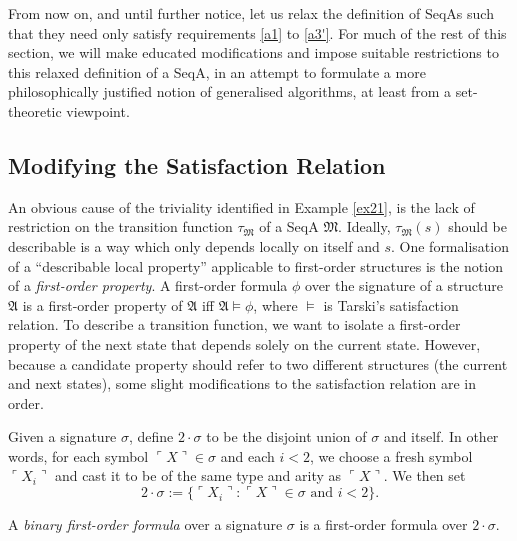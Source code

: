 \documentclass[12pt]{article}
\numberwithin{equation}{section}
\begin{document}
From now on, and until further notice, let us relax the definition of SeqAs such that they need only satisfy requirements \ref{a1} to \ref{a3'}. For much of the rest of this section, we will make educated modifications and impose suitable restrictions to this relaxed definition of a SeqA, in an attempt to formulate a more philosophically justified notion of generalised algorithms, at least from a set-theoretic viewpoint.

\subsection{Modifying the Satisfaction Relation}

An obvious cause of the triviality identified in Example \ref{ex21}, is the lack of restriction on the transition function $\tau_{\mathfrak{M}}$ of a SeqA $\mathfrak{M}$. Ideally, $\tau_{\mathfrak{M}}(s)$ should be describable is a way which only depends locally on itself and $s$. One formalisation of a ``describable local property'' applicable to first-order structures is the notion of a \emph{first-order property}. A first-order formula $\phi$ over the signature of a structure $\mathfrak{A}$ is a first-order property of $\mathfrak{A}$ iff $\mathfrak{A} \models \phi$, where $\models$ is Tarski's satisfaction relation. To describe a transition function, we want to isolate a first-order property of the next state that depends solely on the current state. However, because a candidate property should refer to two different structures (the current and next states), some slight modifications to the satisfaction relation are in order.

\begin{defi}
Given a signature $\sigma$, define $2 \cdot \sigma$ to be the disjoint union of $\sigma$ and itself. In other words, for each symbol $\ulcorner X \urcorner \in \sigma$ and each $i < 2$, we choose a fresh symbol $\ulcorner X_{i} \urcorner$ and cast it to be of the same type and arity as $\ulcorner X \urcorner$. We then set
\begin{equation*}
    2 \cdot \sigma := \{\ulcorner X_{i} \urcorner : \ulcorner X \urcorner \in \sigma \text{ and } i < 2\} \text{.}
\end{equation*}
\end{defi}

\begin{defi}
A \emph{binary first-order formula} over a signature $\sigma$ is a first-order formula over $2 \cdot \sigma$.
\end{defi}
\end{document}
